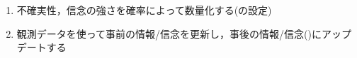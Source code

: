 \begin{enumerate}
	\item 不確実性，信念の強さを確率によって数量化する(の設定)
	\item 観測データを使って事前の情報/信念を更新し，事後の情報/信念()にアップデートする
\end{enumerate}

